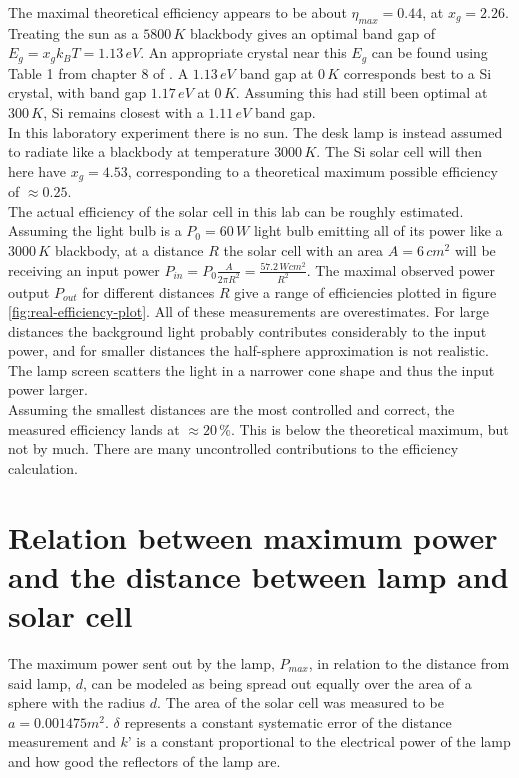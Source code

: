 \documentclass[a4paper,twoside=false,abstract=false,numbers=noenddot,
titlepage=false,headings=small,parskip=half,version=last]{scrartcl}
\begin{document}
The maximal theoretical efficiency appears to be about $\eta_{max}=0.44$, at $x_g=2.26$.
Treating the sun as a $5800\,K$ blackbody gives an optimal band gap of $E_g =
x_g k_B T = 1.13\,eV$.
An appropriate crystal near this $E_g$ can be found using Table 1 from chapter 8 of \cite{Kittel}.
A $1.13\,eV$ band gap at $0\,K$ corresponds best to a Si crystal, with band gap
$1.17\,eV$ at $0\,K$.
Assuming this had still been optimal at $300\,K$, Si remains closest with a
$1.11\,eV$ band gap.\\
In this laboratory experiment there is no sun. The desk lamp is instead assumed to radiate like a blackbody at temperature $3000\,K$. The Si solar cell will then here have $x_g = 4.53$, corresponding to a theoretical maximum possible efficiency of $\approx 0.25$.\\
The actual efficiency of the solar cell in this lab can be roughly estimated.
Assuming the light bulb is a $P_0=60\,W$ light bulb emitting all of its power
like a $3000\,K$ blackbody, at a distance $R$ the solar cell with an area
$A=6\,cm^2$ will be receiving an input power $P_{in} = P_0 \frac{A}{2\pi R^2}
= \frac{57.2\,Wcm^2}{R^2}$.
The maximal observed power output $P_{out}$ for different distances $R$ give a range of efficiencies plotted in figure \ref{fig:real-efficiency-plot}.
All of these measurements are overestimates.
For large distances the background light probably contributes considerably to the input power, and for smaller distances the half-sphere approximation is not realistic.
The lamp screen scatters the light in a narrower cone shape and thus the input power larger.\\
Assuming the smallest distances are the most controlled and correct, the measured efficiency lands at $\approx 20\,\%$. This is below the theoretical maximum, but not by much. There are many uncontrolled contributions to the efficiency calculation.

\section{Relation between maximum power and the distance between lamp and solar cell}
The maximum power sent out by the lamp, $P_{max}$, in relation to the distance from said lamp, $d$, can be modeled as being spread out equally over the area of a sphere with the radius $d$. The area of the solar cell was measured to be $a=0.001475 m^{2}$. $\delta$ represents a constant systematic error of the distance measurement and $k’$ is a constant proportional to the electrical power of the lamp and how good the reflectors of the lamp are.
\end{document}
